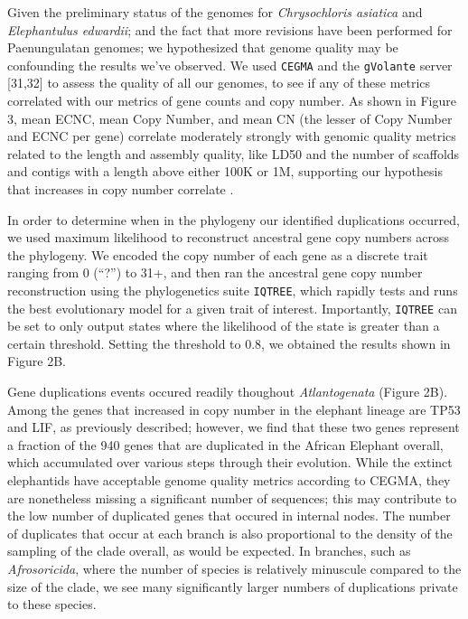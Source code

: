 \documentclass[]{elsarticle} %
\begin{document}
Given the preliminary status of the genomes for \emph{Chrysochloris
asiatica} and \emph{Elephantulus edwardii}; and the fact that more
revisions have been performed for Paenungulatan genomes; we hypothesized
that genome quality may be confounding the results we've observed. We
used \texttt{CEGMA} and the \texttt{gVolante} server {[}31,32{]} to
assess the quality of all our genomes, to see if any of these metrics
correlated with our metrics of gene counts and copy number. As shown in
Figure 3, mean ECNC, mean Copy Number, and mean CN (the lesser of Copy
Number and ECNC per gene) correlate moderately strongly with genomic
quality metrics related to the length and assembly quality, like LD50
and the number of scaffolds and contigs with a length above either 100K
or 1M, supporting our hypothesis that increases in copy number correlate
.

In order to determine when in the phylogeny our identified duplications
occurred, we used maximum likelihood to reconstruct ancestral gene copy
numbers across the phylogeny. We encoded the copy number of each gene as
a discrete trait ranging from 0 (``?'') to 31+, and then ran the
ancestral gene copy number reconstruction using the phylogenetics suite
\texttt{IQTREE}, which rapidly tests and runs the best evolutionary
model for a given trait of interest. Importantly, \texttt{IQTREE} can be
set to only output states where the likelihood of the state is greater
than a certain threshold. Setting the threshold to 0.8, we obtained the
results shown in Figure 2B.

Gene duplications events occured readily thoughout \emph{Atlantogenata}
(Figure 2B). Among the genes that increased in copy number in the
elephant lineage are TP53 and LIF, as previously described; however, we
find that these two genes represent a fraction of the 940 genes that are
duplicated in the African Elephant overall, which accumulated over
various steps through their evolution. While the extinct elephantids
have acceptable genome quality metrics according to CEGMA, they are
nonetheless missing a significant number of sequences; this may
contribute to the low number of duplicated genes that occured in
internal nodes. The number of duplicates that occur at each branch is
also proportional to the density of the sampling of the clade overall,
as would be expected. In branches, such as \emph{Afrosoricida}, where
the number of species is relatively minuscule compared to the size of
the clade, we see many significantly larger numbers of duplications
private to these species.
\end{document}
